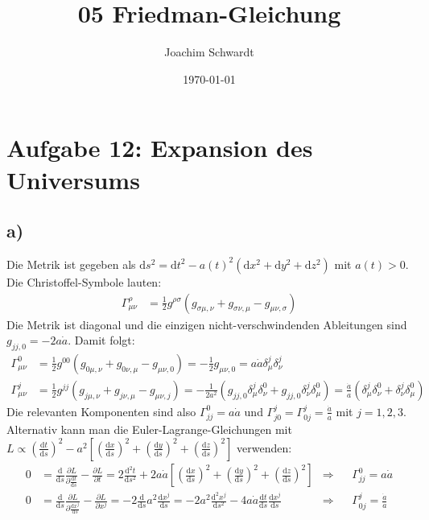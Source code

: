 \documentclass[a4paper,12pt]{article}
\newcommand{\kla}{}
\newcommand{\klam}{}
\newcommand{\tecxt}{}
\begin{document}
\title{05 Friedman-Gleichung}
\author{Joachim Schwardt}
\date{\today}
\maketitle

\section*{Aufgabe 12: Expansion des Universums}
\subsection*{a)}Die Metrik ist gegeben als $\tecxt\text{d}s^2=\tecxt\text{d}t^2-a(t)^2\kla\left( {\tecxt\text{d}x^2+\tecxt\text{d}y^2+\tecxt\text{d}z^2} \right)$ mit $a(t)>0$. Die Christoffel-Symbole lauten:
\begin{align*}
\Gamma^\rho_{\mu\nu}&=\frac{1}{2}g^{\rho\sigma}\kla\left( {g_{\sigma\mu,\nu}+g_{\sigma\nu,\mu}-g_{\mu\nu,\sigma}} \right)
\end{align*}
Die Metrik ist diagonal und die einzigen nicht-verschwindenden Ableitungen sind $g_{jj,0}=-2a\dot{a}$. Damit folgt:
\begin{align*}
\Gamma^0_{\mu\nu}&=\frac{1}{2}g^{00}\kla\left( {g_{0\mu,\nu}+g_{0\nu,\mu}-g_{\mu\nu,0}} \right)=-\frac{1}{2}g_{\mu\nu,0}=a\dot{a}\delta^j_\mu\delta^j_\nu\\
\Gamma^j_{\mu\nu}&=\frac{1}{2}g^{jj}\kla\left( {g_{j\mu,\nu}+g_{j\nu,\mu}-g_{\mu\nu,j}} \right)=-\frac{1}{2a^2}\kla\left( {g_{jj,0}\delta^j_\mu\delta^0_\nu+g_{jj,0}\delta^j_\nu\delta^0_\mu} \right)=\frac{\dot{a}}{a}\kla\left( {\delta^j_\mu\delta^0_\nu+\delta^j_\nu\delta^0_\mu} \right)
\end{align*}
Die relevanten Komponenten sind also $\Gamma^0_{jj}=a\dot{a}$ und $\Gamma^j_{j0}=\Gamma^j_{0j}=\frac{\dot{a}}{a}$ mit $j=1,2,3$. Alternativ kann man die Euler-Lagrange-Gleichungen mit $L\propto\kla\left( {\frac{\tecxt\text{d}t}{\tecxt\text{d}s}} \right)^2-a^2\klam\left[ {\kla\left( {\frac{\tecxt\text{d}x}{\tecxt\text{d}s}} \right)^2+\kla\left( {\frac{\tecxt\text{d}y}{\tecxt\text{d}s}} \right)^2+\kla\left( {\frac{\tecxt\text{d}z}{\tecxt\text{d}s}} \right)^2} \right]$ verwenden:
\begin{align*}
0&=\frac{\tecxt\text{d}}{\tecxt\text{d}s}\frac{\partial L}{\partial\frac{\tecxt\text{d}t}{\tecxt\text{d}s}}-\frac{\partial L}{\partial t}=2\frac{\tecxt\text{d}^2t}{\tecxt\text{d}s^2}+2a\dot{a}\klam\left[ {\kla\left( {\frac{\tecxt\text{d}x}{\tecxt\text{d}s}} \right)^2+\kla\left( {\frac{\tecxt\text{d}y}{\tecxt\text{d}s}} \right)^2+\kla\left( {\frac{\tecxt\text{d}z}{\tecxt\text{d}s}} \right)^2} \right]&\Rightarrow &&\Gamma^0_{jj}=a\dot{a}\\
0&=\frac{\tecxt\text{d}}{\tecxt\text{d}s}\frac{\partial L}{\partial\frac{\tecxt\text{d}x^j}{\tecxt\text{d}s}}-\frac{\partial L}{\partial x^j}=-2\frac{\tecxt\text{d}}{\tecxt\text{d}s}a^2\frac{\tecxt\text{d}x^j}{\tecxt\text{d}s}=-2a^2\frac{\tecxt\text{d}^2x^j}{\tecxt\text{d}s^2}-4a\dot{a}\frac{\tecxt\text{d}t}{\tecxt\text{d}s}\frac{\tecxt\text{d}x^j}{\tecxt\text{d}s}&\Rightarrow &&\Gamma^j_{0j}=\frac{\dot{a}}{a}
\end{align*}
\end{document}
